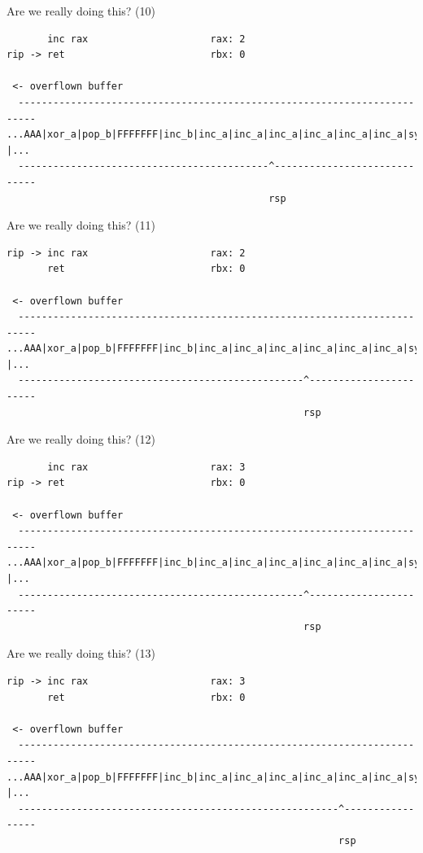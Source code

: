 \documentclass[9pt,aspectratio=169]{beamer}
\begin{document}
\begin{frame}[label={sec:org5d19389},fragile]{Are we really doing this? (10)}
 \begin{verbatim}
       inc rax                     rax: 2
rip -> ret                         rbx: 0

 <- overflown buffer 
  -------------------------------------------------------------------------
...AAA|xor_a|pop_b|FFFFFFF|inc_b|inc_a|inc_a|inc_a|inc_a|inc_a|inc_a|sys |...
  -------------------------------------------^-----------------------------
                                             rsp
\end{verbatim}
\end{frame}
\begin{frame}[label={sec:orged852af},fragile]{Are we really doing this? (11)}
 \begin{verbatim}
rip -> inc rax                     rax: 2
       ret                         rbx: 0

 <- overflown buffer 
  -------------------------------------------------------------------------
...AAA|xor_a|pop_b|FFFFFFF|inc_b|inc_a|inc_a|inc_a|inc_a|inc_a|inc_a|sys |...
  -------------------------------------------------^-----------------------
                                                   rsp
\end{verbatim}
\end{frame}
\begin{frame}[label={sec:org173165a},fragile]{Are we really doing this? (12)}
 \begin{verbatim}
       inc rax                     rax: 3
rip -> ret                         rbx: 0

 <- overflown buffer 
  -------------------------------------------------------------------------
...AAA|xor_a|pop_b|FFFFFFF|inc_b|inc_a|inc_a|inc_a|inc_a|inc_a|inc_a|sys |...
  -------------------------------------------------^-----------------------
                                                   rsp
\end{verbatim}
\end{frame}
\begin{frame}[label={sec:org998371b},fragile]{Are we really doing this? (13)}
 \begin{verbatim}
rip -> inc rax                     rax: 3
       ret                         rbx: 0

 <- overflown buffer 
  -------------------------------------------------------------------------
...AAA|xor_a|pop_b|FFFFFFF|inc_b|inc_a|inc_a|inc_a|inc_a|inc_a|inc_a|sys |...
  -------------------------------------------------------^-----------------
                                                         rsp
\end{verbatim}
\end{frame}
\end{document}
